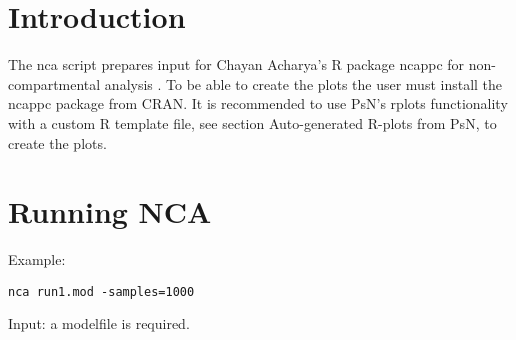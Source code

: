 

\newcommand{\guidetoolname}{nca}



\maketitle

\section{Introduction}
The nca script prepares input for Chayan Acharya's R package ncappc for non-compartmental analysis \cite{Chayan}. 
To be able to create the plots the user must install the ncappc package from CRAN.
It is recommended to use PsN's rplots functionality with a custom R template file, 
see section Auto-generated R-plots from PsN, 
to create the plots.
\section{Running NCA}
Example:

\begin{verbatim}
nca run1.mod -samples=1000
\end{verbatim}

Input: a modelfile is required.

